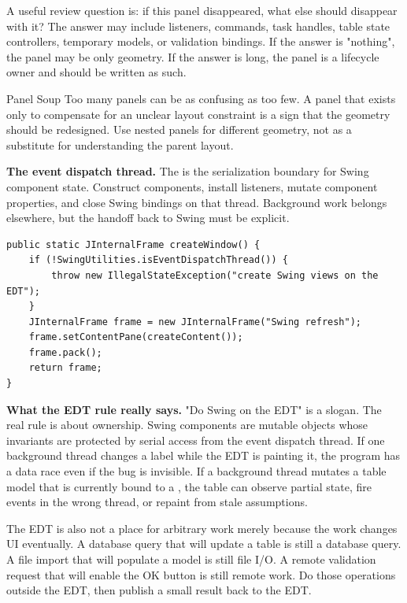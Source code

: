 A useful review question is: if this panel disappeared, what else should disappear with it? The answer may include listeners, commands, task handles, table state controllers, temporary models, or validation bindings. If the answer is "nothing", the panel may be only geometry. If the answer is long, the panel is a lifecycle owner and should be written as such.

\begin{pitfallbox}{Panel Soup}
Too many panels can be as confusing as too few. A panel that exists only to compensate for an unclear layout constraint is a sign that the geometry should be redesigned. Use nested panels for different geometry, not as a substitute for understanding the parent layout.
\end{pitfallbox}

\textbf{The event dispatch thread.} The \edt{} is the serialization boundary for Swing component state. Construct components, install listeners, mutate component properties, and close Swing bindings on that thread. Background work belongs elsewhere, but the handoff back to Swing must be explicit.

\begin{lstlisting}[caption={A refresh example that constructs the component tree on the EDT.}]
public static JInternalFrame createWindow() {
    if (!SwingUtilities.isEventDispatchThread()) {
        throw new IllegalStateException("create Swing views on the EDT");
    }
    JInternalFrame frame = new JInternalFrame("Swing refresh");
    frame.setContentPane(createContent());
    frame.pack();
    return frame;
}
\end{lstlisting}

\textbf{What the EDT rule really says.} "Do Swing on the EDT" is a slogan. The real rule is about ownership. Swing components are mutable objects whose invariants are protected by serial access from the event dispatch thread. If one background thread changes a label while the EDT is painting it, the program has a data race even if the bug is invisible. If a background thread mutates a table model that is currently bound to a , the table can observe partial state, fire events in the wrong thread, or repaint from stale assumptions.

The EDT is also not a place for arbitrary work merely because the work changes UI eventually. A database query that will update a table is still a database query. A file import that will populate a model is still file I/O. A remote validation request that will enable the OK button is still remote work. Do those operations outside the EDT, then publish a small result back to the EDT.

